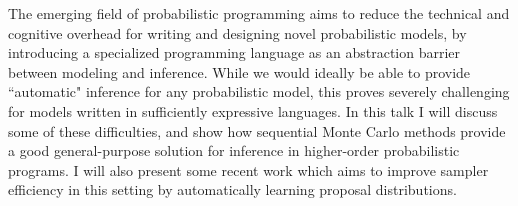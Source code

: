 The emerging field of probabilistic programming aims to reduce the technical and cognitive overhead for writing and designing novel probabilistic models, by introducing a specialized programming language as an abstraction barrier between modeling and inference. While we would ideally be able to provide ``automatic" inference for any probabilistic model, this proves severely challenging for models written in sufficiently expressive languages. In this talk I will discuss some of these difficulties, and show how sequential Monte Carlo methods provide a good general-purpose solution for inference in higher-order probabilistic programs. I will also present some recent work which aims to improve sampler efficiency in this setting by automatically learning proposal distributions.
